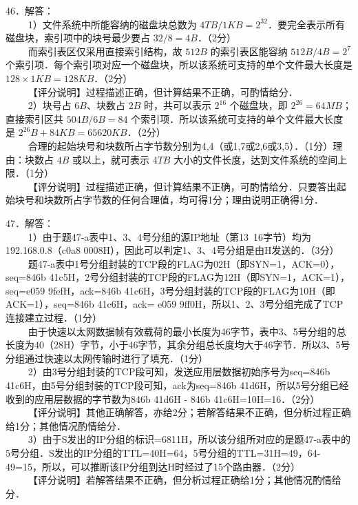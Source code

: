 46．解答： \\
$\qquad$ 1）文件系统中所能容纳的磁盘块总数为 $4TB/1KB=2^{32}$．要完全表示所有磁盘块，索引项中的块号最少要占 $32/8=4B$．（2分） \\
$\qquad$ 而索引表区仅采用直接索引结构，故 $512B$ 的索引表区能容纳 $512B/4B=2^7$ 个索引项．每个索引项对应一个磁盘块，所以该系统可支持的单个文件最大长度是 $128\times1KB=128KB$．（2分） \\
$\qquad$ 【评分说明】过程描述正确，但计算结果不正确，可酌情给分． \\
$\qquad$ 2）块号占 $6B$、块数占 $2B$ 时，共可以表示 $2^{16}$ 个磁盘块，即 $2^{26}=64MB$；直接索引区共 $504B/6B=84$ 个索引项．所以该系统可支持的单个文件最大长度是 $2^{26}B+84KB=65620KB$．（2分） \\
$\qquad$ 合理的起始块号和块数所占字节数分别为4,4（或1,7或2,6或3,5）．（1分）理由：块数占 $4B$ 或以上，就可表示 $4TB$ 大小的文件长度，达到文件系统的空间上限．（1分） \\
$\qquad$ 【评分说明】过程描述正确，但计算结果不正确，可酌情给分．只要答出起始块号和块数所占字节数的任何合理值，均可得1分；理由说明正确得1分．

47．解答： \\
$\qquad$ 1）由于题47-a表中1、3、4号分组的源IP地址（第13~16字节）均为192.168.0.8（c0a8 0008H），因此可以判定1、3、4号分组是由H发送的．（3分） \\
$\qquad$ 题47-a表中1号分组封装的TCP段的FLAG为02H（即SYN=1，ACK=0），seq=846b 41c5H，2号分组封装的TCP段的FLAG为12H（即SYN=1，ACK=1），seq=e059 9fefH，ack=846b 41c6H，3号分组封装的TCP段的FLAG为10H（即ACK=1），seq=846b 41c6H，ack= e059 9ff0H，所以1、2、3号分组完成了TCP连接建立过程．（1分） \\
$\qquad$ 由于快速以太网数据帧有效载荷的最小长度为46字节，表中3、5号分组的总长度为40（28H）字节，小于46字节，其余分组总长度均大于46字节．所以3、5号分组通过快速以太网传输时进行了填充．（1分） \\
$\qquad$ 2）由3号分组封装的TCP段可知，发送应用层数据初始序号为seq=846b 41c6H，由5号分组封装的TCP段可知，ack为seq=846b 41d6H，所以5号分组已经收到的应用层数据的字节数为846b 41d6H - 846b 41c6H=10H=16．（2分） \\
$\qquad$ 【评分说明】其他正确解答，亦给2分；若解答结果不正确，但分析过程正确给1分；其他情况酌情给分． \\
$\qquad$ 3）由于S发出的IP分组的标识=6811H，所以该分组所对应的是题47-a表中的5号分组．S发出的IP分组的TTL=40H=64，5号分组的TTL=31H=49，64-49=15，所以，可以推断该IP分组到达H时经过了15个路由器．（2分） \\
$\qquad$ 【评分说明】若解答结果不正确，但分析过程正确给1分；其他情况酌情给分．